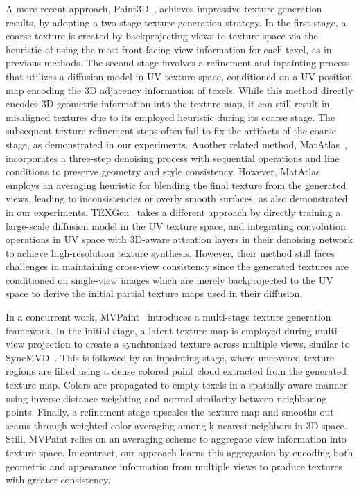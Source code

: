 A more recent approach, Paint3D~\cite{Zeng:2024:Paint3D}, achieves impressive texture generation results, by adopting a two-stage texture generation strategy. 
In the first stage, a coarse texture is created by backprojecting views to texture space via the heuristic of
using the most front-facing view information for each texel, as in previous methods. The second stage involves a 
refinement and inpainting process that utilizes a diffusion model in UV texture space, conditioned on a UV position map 
encoding the 3D adjacency information of texels. While this method directly encodes 3D geometric 
information into the texture map, it can still result in misaligned textures due to its employed heuristic during its coarse stage. 
The subsequent texture refinement steps often fail to fix the artifacts of the coarse stage, as demonstrated in our experiments.
Another related method, MatAtlas~\cite{Ceylan:2024:Matatlas}, incorporates a three-step denoising process 
with sequential operations and line conditions to preserve geometry and style consistency. However, 
MatAtlas employs an averaging heuristic for blending the final texture from the generated views, leading to inconsistencies or overly smooth surfaces, as also demonstrated in our experiments. TEXGen~\cite{Yu:2024:TEXGen} takes a different approach by directly training a large-scale diffusion model in the UV texture 
space, and integrating convolution operations 
in UV space with 3D-aware attention layers in their denoising network to achieve high-resolution texture synthesis. However, their method still faces challenges in maintaining cross-view consistency since the 
generated textures are conditioned on single-view images which are merely backprojected to the UV space to derive the initial partial texture maps used in their diffusion.

In a concurrent work, MVPaint~\cite{Cheng:2024:MVPaint} introduces a multi-stage texture generation framework. In the 
initial stage, a latent texture map is employed during multi-view projection to create a synchronized texture 
across multiple views, similar to SyncMVD~\cite{Liu:2024:SyncMVD}. This is followed by an inpainting stage, where 
uncovered texture regions are filled using a dense colored point cloud extracted from the generated texture map. 
Colors are propagated to empty texels in a spatially aware manner using inverse distance weighting and normal 
similarity between neighboring points. Finally, a refinement stage upscales the texture map and smooths out seams 
through weighted color averaging among k-nearest neighbors in 3D space. Still, MVPaint relies on an averaging scheme to
aggregate view information into texture space. In contract, our approach learns this aggregation by encoding both 
geometric and appearance information from multiple views to produce textures with greater  consistency.

